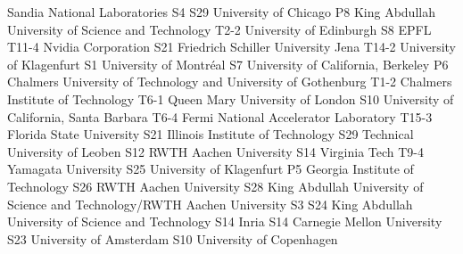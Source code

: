 \begin{multicols}{2}
{}
{}
{Sandia National Laboratories}
{S4}
{S29}
{}
{}
{}
{}
{}
{University of Chicago}
{P8}
{}
{}
{}
{}
{}
{}
{King Abdullah University of Science and Technology}
{T2-2}
{}
{}
{}
{}
{}
{}
{University of Edinburgh}
{S8}
{}
{}
{}
{}
{}
{}
{EPFL}
{T11-4}
{}
{}
{}
{}
{}
{}
{Nvidia Corporation}
{S21}
{}
{}
{}
{}
{}
{}
{Friedrich Schiller University Jena}
{T14-2}
{}
{}
{}
{}
{}
{}
{University of Klagenfurt}
{S1}
{}
{}
{}
{}
{}
{}
{University of Montr\'eal}
{S7}
{}
{}
{}
{}
{}
{}
{University of California, Berkeley}
{P6}
{}
{}
{}
{}
{}
{}
{Chalmers University of Technology and University of Gothenburg}
{T1-2}
{}
{}
{}
{}
{}
{}
{Chalmers Institute of Technology}
{T6-1}
{}
{}
{}
{}
{}
{}
{Queen Mary University of London}
{S10}
{}
{}
{}
{}
{}
{}
{University of California, Santa Barbara}
{T6-4}
{}
{}
{}
{}
{}
{}
{Fermi National Accelerator Laboratory}
{T15-3}
{}
{}
{}
{}
{}
{}
{Florida State University}
{S21}
{}
{}
{}
{}
{}
{}
{Illinois Institute of Technology}
{S29}
{}
{}
{}
{}
{}
{}
{Technical University of Leoben}
{S12}
{}
{}
{}
{}
{}
{}
{RWTH Aachen University}
{S14}
{}
{}
{}
{}
{}
{}
{Virginia Tech}
{T9-4}
{}
{}
{}
{}
{}
{}
{Yamagata University}
{S25}
{}
{}
{}
{}
{}
{}
{University of Klagenfurt}
{P5}
{}
{}
{}
{}
{}
{}
{Georgia Institute of Technology}
{S26}
{}
{}
{}
{}
{}
{}
{RWTH Aachen University}
{S28}
{}
{}
{}
{}
{}
{}
{King Abdullah University of Science and Technology/RWTH Aachen University}
{S3}
{S24}
{}
{}
{}
{}
{}
{King Abdullah University of Science and Technology}
{S14}
{}
{}
{}
{}
{}
{}
{Inria}
{S14}
{}
{}
{}
{}
{}
{}
{Carnegie Mellon University}
{S23}
{}
{}
{}
{}
{}
{}
{University of Amsterdam}
{S10}
{}
{}
{}
{}
{}
{}
{University of Copenhagen}

\end{multicols}
